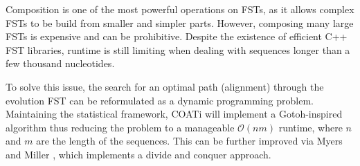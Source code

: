 Composition is one of the most powerful operations on FSTs, as it allows complex
FSTs to be build from smaller and simpler parts.
However, composing many large FSTs is expensive and can be prohibitive.
Despite the existence of efficient C++ FST libraries, runtime is still limiting
when dealing with sequences longer than a few thousand nucleotides.

To solve this issue, the search for an optimal path (alignment) through the
evolution FST can be reformulated as a dynamic programming problem.
Maintaining the statistical framework, COATi will implement a Gotoh-inspired
algorithm thus reducing the problem to a manageable $\mathcal{O}(nm)$
runtime, where $n$ and $m$ are the length of the sequences.
This can be further improved via Myers and Miller \parencite{myers_miller_1988},
which implements a divide and conquer approach.

